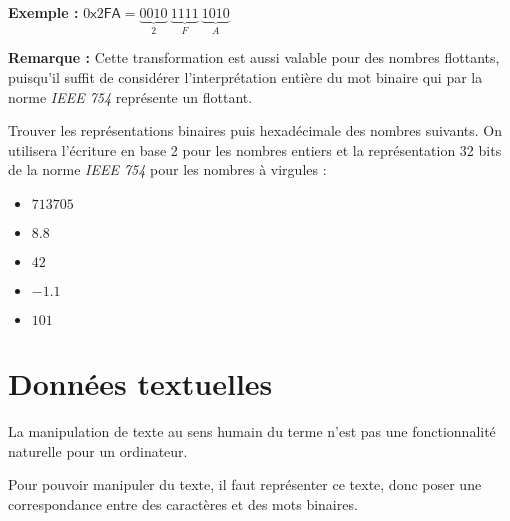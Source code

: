 \documentclass[../../main.tex]{subfiles}
\begin{document}
\textbf{Exemple :}  $0\textsf{x}2\textsf{FA} = \underbrace{0010}_{2}\ \underbrace{1111}_{F}\ \underbrace{1010}_{A}$

\textbf{Remarque :} Cette transformation est aussi valable pour des nombres flottants, puisqu'il suffit de considérer l'interprétation entière du mot binaire qui par la norme \textit{IEEE 754} représente un flottant.

\newline
Trouver les représentations binaires puis hexadécimale des nombres suivants. On utilisera l'écriture en base 2 pour les nombres entiers et la représentation 32 bits de la norme \textit{IEEE 754} pour les nombres à virgules :
\begin{itemize}
     \item $713705$
     \item $8.8$
     \item $42$
     \item $-1.1$
     \item $101$
\end{itemize}
\section{Données textuelles} \label{sec:donn_es_textuelles}
La manipulation de texte au sens humain du terme n'est pas une fonctionnalité naturelle pour un ordinateur.
 
Pour pouvoir manipuler du texte, il faut représenter ce texte, donc poser une correspondance entre des caractères et des mots binaires. 
\end{document}
